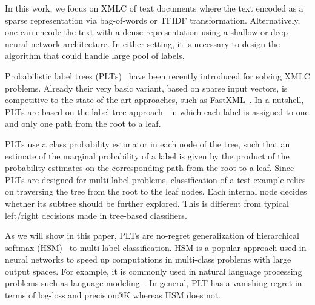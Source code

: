 \documentclass{article}
\newcommand{\Algo}[1]{\textsc{#1}}
\begin{document}
In this work, we focus on XMLC of text documents where the text
encoded as a sparse representation via bag-of-words or TFIDF
transformation. Alternatively, one can encode the text with a dense
representation using a shallow or deep neural network architecture.
In either setting, it is necessary to design the algorithm that could
handle large pool of labels.
%


Probabilistic label trees (\Algo{PLT}s)~\citep{Jasinska_et_al_2016}
have been recently introduced for solving XMLC problems. Already their
very basic variant, based on sparse input vectors, is competitive to
the state of the art approaches, such as
FastXML~\citep{Prabhu_Varma_2014}. In a nutshell, \Algo{PLT}s are
based on the label tree
approach~\cite{Beygelzimer_et_al_2009a,Bengio_et_al_2010,Deng_et_al_2011}
in which each label is assigned to one and only one path from the root
to a leaf.

\Algo{PLT}s use a class probability estimator in each node of the tree, such that an estimate of the marginal probability of a label is given by the product of the probability estimates on the corresponding path from the root to a leaf.  Since \Algo{PLT}s are designed for multi-label problems, classification of a test example relies on traversing the tree from the root to the leaf nodes. Each internal node decides whether its subtree should be further explored. This is different from typical left/right decisions made in tree-based classifiers. 

%

As we will show in this paper, \Algo{PLT}s are no-regret
generalization of hierarchical softmax (HSM)~\citep{Morin_Bengio_2005}
to multi-label classification. HSM is a popular approach used in
neural networks to speed up computations in multi-class problems with
large output spaces. For example, it is commonly used in natural
language processing problems such as language
modeling~\citep{Mikolov_et_al_2013}. In general, PLT has a vanishing
regret in terms of log-loss and precision@K whereas HSM does not.
\end{document}
